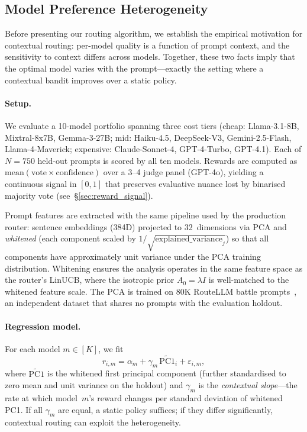 
\subsection{Model Preference Heterogeneity}
\label{sec:contextual_heterogeneity}

Before presenting our routing algorithm, we establish the empirical
motivation for contextual routing: per-model quality is a function of
prompt context, and the sensitivity to context differs across models.
Together, these two facts imply that the optimal model varies with the
prompt---exactly the setting where a contextual bandit improves over a
static policy.


\paragraph{Setup.}
We evaluate a 10-model portfolio spanning three cost tiers (cheap: Llama-3.1-8B,
Mixtral-8x7B, Gemma-3-27B; mid: Haiku-4.5, DeepSeek-V3, Gemini-2.5-Flash,
Llama-4-Maverick; expensive: Claude-Sonnet-4, GPT-4-Turbo, GPT-4.1).
Each of $N{=}750$ held-out prompts is scored by all ten models.
Rewards are computed as $\text{mean}(\text{vote} \times \text{confidence})$
over a 3--4 judge panel (GPT-4o), yielding a continuous signal in $[0,1]$
that preserves evaluative nuance lost by binarised majority vote
(see~\S\ref{sec:reward_signal}).

Prompt features are extracted with the same pipeline used by the production
router: sentence embeddings (384D) projected to 32~dimensions via PCA
and \emph{whitened} (each component scaled by $1/\sqrt{\text{explained\_variance}_j}$)
so that all components have approximately unit variance under the PCA
training distribution.
Whitening ensures the analysis operates in the same feature space as
the router's LinUCB, where the isotropic prior $A_0 = \lambda I$ is
well-matched to the whitened feature scale.
The PCA is trained on 80K RouteLLM battle prompts~\cite{ong2024routellm},
an independent dataset that shares no prompts with the evaluation holdout.

\paragraph{Regression model.}
For each model $m \in [K]$, we fit
\[
    r_{i,m} = \alpha_m + \gamma_m \, \widetilde{\mathrm{PC1}}_i + \varepsilon_{i,m},
\]
where $\widetilde{\mathrm{PC1}}$ is the whitened first principal component
(further standardised to zero mean and unit variance on the holdout)
and $\gamma_m$ is the \emph{contextual slope}---the rate at which model~$m$'s
reward changes per standard deviation of whitened PC1.
If all $\gamma_m$ are equal, a static policy suffices; if they differ
significantly, contextual routing can exploit the heterogeneity.

